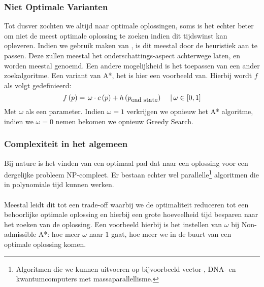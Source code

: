 \subsubsection{Niet Optimale Varianten}
Tot dusver zochten we altijd naar optimale oplossingen, soms is het echter beter om niet de meest optimale oplossing te zoeken indien dit tijdswinst kan opleveren. Indien we gebruik maken van , is dit meestal door de heuristiek aan te passen. Deze zullen meestal het onderschattings-aspect achterwege laten, en worden meestal  genoemd. Een andere mogelijkheid is het toepassen van een ander zoekalgoritme. Een variant van A*, het  is hier een voorbeeld van. Hierbij wordt $f$ als volgt gedefinieerd:
\begin{equation}
f\left(p\right)=\left.\omega\cdot c\left(p\right)+h\left(p_{\mbox{\small{end state}}}\right)\ \ \ \ \right|\omega\in\left[0,1\right]
\end{equation}
Met $\omega$ als een parameter. Indien $\omega=1$ verkrijgen we opnieuw het A* algoritme, indien we $\omega=0$ nemen bekomen we opnieuw Greedy Search.
\subsubsection{Complexiteit in het algemeen}
Bij nature is het vinden van een optimaal pad dat naar een oplossing voor een dergelijke probleem NP-compleet. Er bestaan echter wel parallelle\footnote{Algoritmen die we kunnen uitvoeren op bijvoorbeeld vector-, DNA- en kwantumcomputers met massaparallellisme.} algoritmen die in polynomiale tijd kunnen werken.%
\paragraph{}Meestal leidt dit tot een trade-off waarbij we de optimaliteit reduceren tot een behoorlijke optimale oplossing en hierbij een grote hoeveelheid tijd besparen naar het zoeken van de oplossing. Een voorbeeld hierbij is het instellen van $\omega$ bij Non-admissible A*: hoe meer $\omega$ naar $1$ gaat, hoe meer we in de buurt van een optimale oplossing komen.
